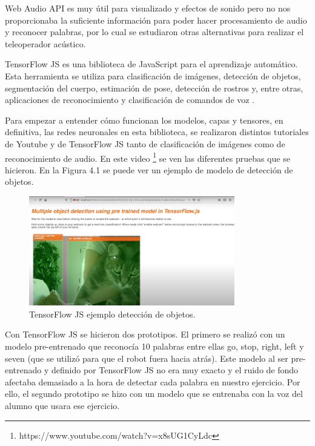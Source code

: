 Web Audio API es muy útil para visualizado y efectos de sonido pero no nos proporcionaba la suficiente información para poder hacer procesamiento de audio y reconocer palabras, por lo cual se estudiaron otras alternativas para realizar el teleoperador acústico. 

TensorFlow JS es una biblioteca de JavaScript para el aprendizaje automático. Esta herramienta se utiliza para clasificación de imágenes, detección de objetos, segmentación del cuerpo, estimación de pose, detección de rostros y, entre otras, aplicaciones de reconocimiento y clasificación de comandos de voz \cite{tensorflowmodel}.

Para empezar a entender cómo funcionan los modelos, capas y  tensores, en definitiva,  las redes neuronales en esta biblioteca, se realizaron distintos tutoriales de Youtube y de TensorFlow JS tanto de clasificación de imágenes como de reconocimiento de audio. En este video \footnote{https://www.youtube.com/watch?v=x8sUG1CyLdc} se ven las diferentes pruebas que se hicieron. En la Figura 4.1 se puede ver un ejemplo de modelo de detección de objetos.

\begin{figure}[H]
    \centering
    \includegraphics[width=0.8\textwidth, height=0.4\textwidth]{chapters/images/imagerecognition.png}
    \caption{TensorFlow JS ejemplo detección de objetos. }
    \label{fig:my_label}
\end{figure}

Con TensorFlow JS se hicieron dos prototipos. El primero se realizó con un modelo pre-entrenado que reconocía 10 palabras entre ellas go, stop, right, left y seven (que se utilizó para que el robot fuera hacia atrás).
Este modelo al ser pre-entrenado y definido por TensorFlow JS no era muy exacto y el ruido de fondo afectaba demasiado a la hora de detectar cada palabra en nuestro ejercicio. Por ello, el segundo prototipo se hizo con un modelo que se entrenaba con la voz del alumno que usara ese ejercicio.

